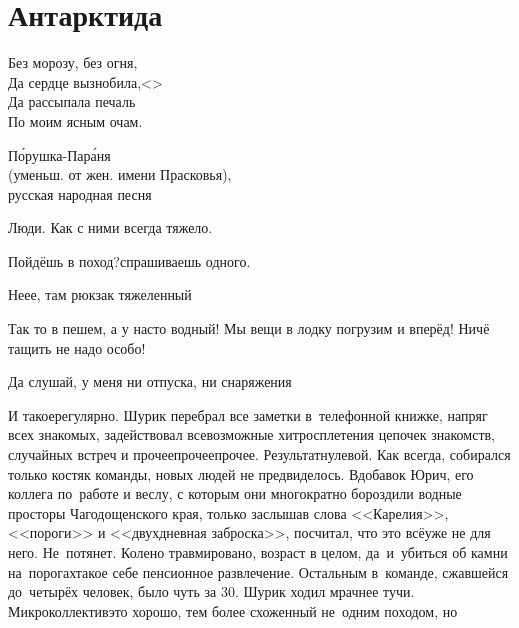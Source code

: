 {
	\chapter{Антарктида}
	\vepsianrose
	
	\fancyhead[LE]{\fancyplain{}{\bfseries \parttitle}}
	\fancyhead[RO]{\fancyplain{}{\bfseries \rightmark}}
	
	\epigraph{%
		Без морозу, без огня,\\
		Да сердце вызнобила,<\myldots{}>\\
		Да рассыпала печаль\\
		По моим ясным очам.
	}	
	{
		\begin{flushright}
			\small{П\'орушка-Пар\'аня\\(уменьш. от жен. имени Прасковья),\\русская народная песня}
		\end{flushright}
	}
	
	Люди. Как с ними всегда тяжело.
	
	\diagdash Пойдёшь в поход?\mdash спрашиваешь одного.
	
	\diagdash Не\sdash е\sdash е, там рюкзак тяжеленный\myldots{}
	
	\diagdash Так то в пешем, а у нас\sdash то водный! Мы вещи в лодку погрузим и вперёд! Ничё тащить не надо особо!
	
	\diagdash Да слушай, у меня ни отпуска, ни снаряжения\myldots{}
	
	И такое\mdash регулярно. Шурик перебрал все заметки в~телефонной книжке, напряг всех знакомых, задействовал всевозможные хитросплетения цепочек знакомств, случайных встреч и прочее\sdash прочее\sdash прочее. Результат\mdash нулевой. Как всегда, собирался только костяк команды, новых людей не предвиделось. Вдобавок Юрич, его коллега по~работе и веслу, с которым они многократно бороздили водные просторы Чагодощенского края, только заслышав слова <<Карелия>>, <<пороги>> и <<двухдневная заброска>>, посчитал, что это всё\mdash уже не для него. Не~потянет. Колено травмировано, возраст в целом, да~и~убиться об камни на~порогах\mdash такое себе пенсионное развлечение. Остальным в~команде, сжавшейся до~четырёх человек, было чуть за 30. Шурик ходил мрачнее тучи. Микроколлектив\mdash это хорошо, тем более схоженный не~одним походом, но\myldots{}
	
}
